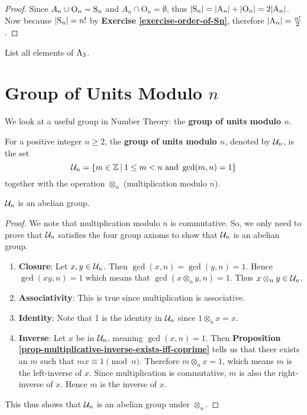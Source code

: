 \begin{proof}
    Since $A_n \cup \mathrm{O}_n = \mathrm{S}_{n}$ and $A_n \cap \mathrm{O}_n = \emptyset$, thus $|\mathrm{S}_{n}| = |\mathrm{A}_{n}| + |\mathrm{O}_n| = 2|\mathrm{A}_{n}|$. Now because $|\mathrm{S}_{n}| = n!$ by \textbf{Exercise \ref{exercise-order-of-Sn}}, therefore $|\mathrm{A}_{n}| = \frac{n!}2$.
\end{proof}

\begin{exercise}
    List all elements of $\mathrm{A}_{3}$.
\end{exercise}

\section{Group of Units Modulo \texorpdfstring{$n$}{n}}
We look at a useful group in Number Theory: the \textbf{group of units modulo $n$}.

\begin{definition}
    For a positive integer $n \geq 2$, the \textbf{group of units modulo $n$}, denoted by $\mathcal{U}_{n}$, is the set
    \[
        \Un{n} = \{m \in \mathbb{Z} \vert 1 \leq m < n \text{ and } \gcd(m, n) = 1\}
    \]
    together with the operation $\otimes_n$ (multiplication modulo $n$).
\end{definition}

\newpage

\begin{proposition}
    $\mathcal{U}_{n}$ is an abelian group.
\end{proposition}
\begin{proof}
    We note that multiplication modulo $n$ is commutative. So, we only need to prove that $\mathcal{U}_{n}$ satisfies the four group axioms to show that $\mathcal{U}_{n}$ is an abelian group.
    \begin{enumerate}
        \item \textbf{Closure}: Let $x, y \in \mathcal{U}_{n}$. Then $\gcd(x, n) = \gcd(y, n) = 1$. Hence $\gcd(xy, n) = 1$ which means that $\gcd(x\otimes_ny,n)=1$. Thus $x\otimes_ny \in \mathcal{U}_{n}$.
        
        \item \textbf{Associativity}: This is true since multiplication is associative.
        
        \item \textbf{Identity}: Note that 1 is the identity in $\mathcal{U}_{n}$ since $1 \otimes_n x = x$.
        
        \item \textbf{Inverse}: Let $x$ be in $\mathcal{U}_{n}$, meaning $\gcd(x, n) = 1$. Then \textbf{Proposition \ref{prop-multiplicative-inverse-exists-iff-coprime}} tells us that theer exists an $m$ such that $mx \equiv 1 \pmod n$. Therefore $m \otimes_n x = 1$, which means $m$ is the left-inverse of $x$. Since multiplication is commutative, $m$ is also the right-inverse of $x$. Hence $m$ is the inverse of $x$.
    \end{enumerate}
    This thus shows that $\mathcal{U}_{n}$ is an abelian group under $\otimes_n$.
\end{proof}

